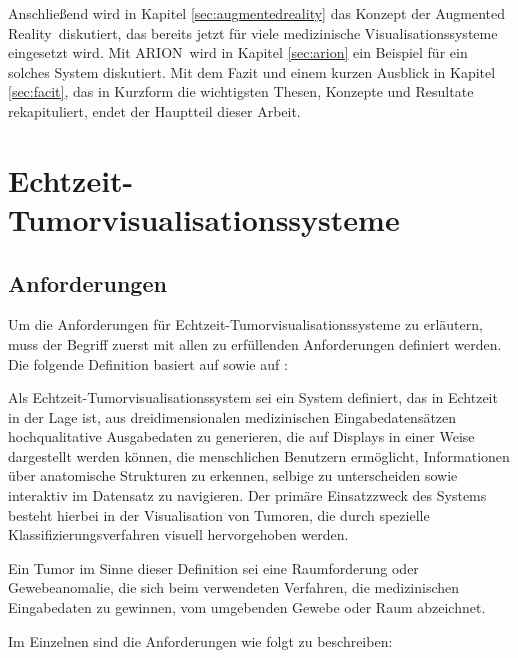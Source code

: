 \documentclass[ngerman,pdftex,paper=A4,DIV=calc,titlepage,12pt]{scrartcl}
\newtheorem[L]{boxedDefinition}{Definition}
\begin{document}
Anschließend wird in Kapitel \vref{sec:augmentedreality} das Konzept der \glqq Augmented Reality\grqq\ diskutiert, das bereits jetzt für viele medizinische Visualisationssysteme eingesetzt wird. Mit ARION\texttrademark\  wird in Kapitel \vref{sec:arion} ein Beispiel für ein solches System diskutiert.
Mit dem Fazit und einem kurzen Ausblick in Kapitel \vref{sec:facit}, das in Kurzform die wichtigsten Thesen, Konzepte und Resultate rekapituliert, endet der Hauptteil dieser Arbeit.
\section{Echtzeit-Tumorvisualisationssysteme}\label{sec:vissystems}
\subsection{Anforderungen}\label{ssec:requirements}
Um die Anforderungen für Echtzeit-Tumorvisualisationssysteme zu erläutern, muss der Begriff zuerst mit allen zu erfüllenden Anforderungen definiert werden. Die folgende Definition basiert auf \cite[Kapitel 3.1.1, Seite 17]{Bruckner2004} sowie auf \cite{Kutter2008}:
\begin{boxedDefinition}\label{def:rttumorvissystem}
 Als Echtzeit-Tumorvisualisationssystem sei ein System definiert, das in Echtzeit in der Lage ist, aus dreidimensionalen medizinischen Eingabedatensätzen hochqualitative Ausgabedaten zu generieren, die auf Displays in einer Weise dargestellt werden können, die menschlichen Benutzern ermöglicht, Informationen über anatomische Strukturen zu erkennen, selbige zu unterscheiden sowie interaktiv im Datensatz zu navigieren. Der primäre Einsatzzweck des Systems besteht hierbei in der Visualisation von Tumoren, die durch spezielle Klassifizierungsverfahren visuell hervorgehoben werden.

 Ein Tumor im Sinne dieser Definition sei eine Raumforderung oder Gewebeanomalie, die sich beim verwendeten Verfahren, die medizinischen Eingabedaten zu gewinnen, vom umgebenden Gewebe oder Raum abzeichnet.
\end{boxedDefinition}
\newpage
\noindent Im Einzelnen sind die Anforderungen wie folgt zu beschreiben:
\end{document}
